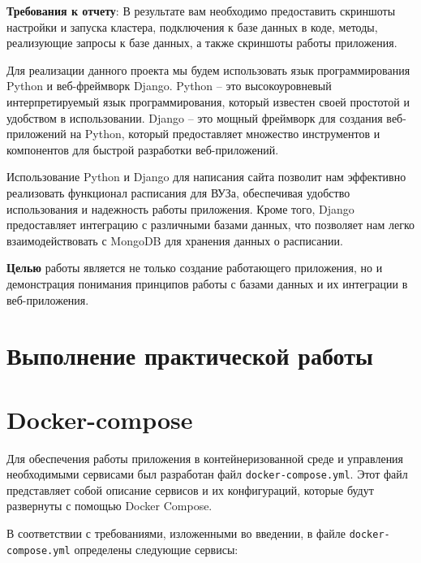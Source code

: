 \textbf{Требования к отчету}:
В результате вам необходимо предоставить скриншоты настройки и
запуска кластера, подключения к базе данных в коде, методы, реализующие
запросы к базе данных, а также скриншоты работы приложения.\par
Для реализации данного проекта мы будем использовать
язык программирования Python и веб-фреймворк Django.
Python – это высокоуровневый интерпретируемый язык программирования,
который известен своей простотой и удобством в использовании.
Django – это мощный фреймворк для создания веб-приложений на Python,
который предоставляет множество инструментов
и компонентов для быстрой разработки веб-приложений.\par
Использование Python и Django для написания сайта позволит
нам эффективно реализовать функционал расписания для ВУЗа,
обеспечивая удобство использования и надежность работы приложения.
Кроме того, Django предоставляет интеграцию с различными базами данных,
что позволяет нам легко взаимодействовать с MongoDB для хранения данных
о расписании.\par
\textbf{Целью} работы является не только создание работающего приложения,
но и демонстрация понимания принципов работы
с базами данных и их интеграции в веб-приложения.

\clearpage

\section*{\LARGE Выполнение практической работы}

\section{Docker-compose}

Для обеспечения работы приложения в контейнеризованной среде
и управления необходимыми сервисами
был разработан файл \texttt{docker-compose.yml}.
Этот файл представляет собой описание сервисов и их конфигураций,
которые будут развернуты с помощью Docker Compose.\par
В соответствии с требованиями, изложенными во введении,
в файле \texttt{docker-compose.yml} определены следующие сервисы:

